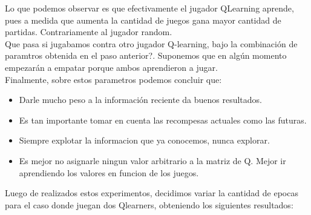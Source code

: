 Lo que podemos observar es que efectivamente el jugador QLearning aprende, pues a medida que aumenta la cantidad de juegos
 gana mayor cantidad de partidas. Contrariamente al jugador random.  \\

Que pasa si jugabamos contra otro jugador Q-learning, bajo la combinación de paramtros obtenida en el paso anterior?.
 Suponemos que en algún momento empezarán a empatar porque ambos aprendieron a jugar.\\

Finalmente, sobre estos parametros podemos concluir que:
\begin{itemize}
  \item  Darle mucho peso a la información reciente da buenos resultados.
  \item  Es tan importante tomar en cuenta las recompesas actuales como las futuras.
  \item  Siempre explotar la informacion que ya conocemos, nunca explorar.
  \item  Es mejor no asignarle ningun valor arbitrario a la matriz de Q. Mejor ir aprendiendo los valores en funcion de
   los juegos.
\end{itemize}


Luego de realizados estos experimentos, decidimos variar la cantidad de epocas para el caso donde juegan dos Qlearners,
obteniendo los siguientes resultados:

